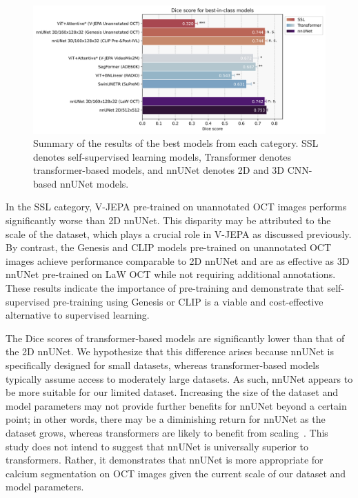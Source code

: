 \documentclass[a4paper,11pt,oneside]{report}
\begin{document}
\begin{figure}[hbt]
    \centering
    \includegraphics[width=1\textwidth]{figures/result_best_in_class_results.png}
    \caption{Summary of the results of the best models from each category. SSL denotes self-supervised learning models, Transformer denotes transformer-based models, and nnUNet denotes 2D and 3D CNN-based nnUNet models.}
    \label{fig:results}
\end{figure}

In the SSL category, V-JEPA pre-trained on unannotated OCT images performs significantly worse than 2D nnUNet. This disparity may be attributed to the scale of the dataset, which plays a crucial role in V-JEPA as discussed previously. By contrast, the Genesis and CLIP models pre-trained on unannotated OCT images achieve performance comparable to 2D nnUNet and are as effective as 3D nnUNet pre-trained on LaW OCT while not requiring additional annotations. These results indicate the importance of pre-training and demonstrate that self-supervised pre-training using Genesis or CLIP is a viable and cost-effective alternative to supervised learning.

The Dice scores of transformer-based models are significantly lower than that of the 2D nnUNet. We hypothesize that this difference arises because nnUNet is specifically designed for small datasets, whereas transformer-based models typically assume access to moderately large datasets. As such, nnUNet appears to be more suitable for our limited dataset. Increasing the size of the dataset and model parameters may not provide further benefits for nnUNet beyond a certain point; in other words, there may be a diminishing return for nnUNet as the dataset grows, whereas transformers are likely to benefit from scaling~\cite{Zhai2021}. This study does not intend to suggest that nnUNet is universally superior to transformers. Rather, it demonstrates that nnUNet is more appropriate for calcium segmentation on OCT images given the current scale of our dataset and model parameters.
\end{document}
